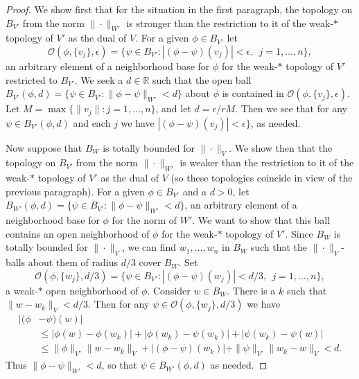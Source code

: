 \documentclass[10pt,a4paper]{amsart}
\newcommand{\bR}{{\mathbb R}}
\newcommand{\cO}{{\mathcal O}}
\begin{document}
\begin{proof}
We show first that for the situation in the first paragraph, the
 topology on $B_{V'}$ from the norm $\|\cdot\|_{W'}$ is stronger than
 the restriction to it of the weak-$*$ topology of $V'$ as the
dual of $V$. For a given $\phi \in  B_{V'}$ let 
\[
\cO(\phi, \{v_j\}, \epsilon) =\{\psi \in  B_{V'}: |(\phi - \psi)(v_j)| < \epsilon, \ \ 
 j = 1, \dots , n\}  ,
\]
 an arbitrary element of a neighborhood base for $\phi$ for the weak-$*$ topology of $V'$
 restricted to $B_{V'}$.
 We seek a $d \in \bR$ such that the open 
 ball $B_{V'}(\phi, d) = \{\psi \in  B_{V'}: \|\phi - \psi\|_{W'} < d\}$ about $\phi$ is contained in
$\cO(\phi, \{v_j\}, \epsilon) $. Let $M = \max\{\|v_j\|: j = 1,\dots , n\}$, and let
$d = \epsilon/rM$. Then we see that for any $\psi \in B_{V'}(\phi, d)$ and each $j$ we 
have $|(\phi - \psi)(v_j)| < \epsilon\}$, as needed.   

Now suppose that $B_W$ is totally bounded for $\|\cdot\|_V$. We show then that 
 the topology on $B_{V'}$ from the norm $\|\cdot\|_{W'}$ is weaker than
 the restriction to it of the weak-$*$ topology of $V'$ as the
dual of $V$ (so these topologies coincide in view of the previous paragraph).
For a given $\phi \in  B_{V'}$ and a $d > 0$, let 
$B_{W'}(\phi, d) = \{\psi \in  B_{V'}: \|\phi - \psi\|_{W'} < d\}$,  
 an arbitrary element of a neighborhood base for $\phi$ for the norm of $W'$.
 We want to show that this ball contains an open neighborhood of $\phi$
 for the weak-$*$ topology of $V'$. Since $B_W$ is totally bounded for $\|\cdot\|_V$,
 we can find $w_1, \dots, w_n$ in $B_W$ such that the $\|\cdot \|_V$-balls
 about them of
 radius $d/3$ cover $B_W$. Set
 \[
\cO(\phi, \{w_j\}, d/3) =\{\psi \in  B_{V'}: |(\phi - \psi)(w_j)| < d/3, \ \ j = 1, \dots , n\}  ,
\]
a weak-$*$ open neighborhood of $\phi$. Consider $w \in B_W$. There is
a $k$ such that $\|w - w_k\|_V < d/3$. Then for any $\psi \in \cO(\phi, \{w_j\}, d/3)$
we have
\begin{align*}
|(\phi & - \psi)(w)| \\
&\leq |\phi(w) - \phi(w_k)| + |\phi(w_k) - \psi(w_k)| + |\psi(w_k) - \psi(w)|  \\
&\leq \|\phi\|_{V'}\|w - w_k\|_V +  |(\phi - \psi)(w_k)| + \|\psi\|_{V'}\|w_k - w\|_V    < d   .
\end{align*}
Thus $\|\phi - \psi\|_{W'} < d$, so that $\psi \in B_{W'}(\phi, d)$ as needed.


\end{proof}
\end{document}
